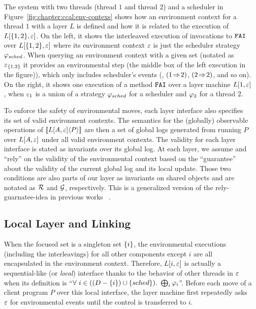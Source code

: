 The system with two threads
(thread $1$ and thread $2$) and a scheduler in Figure~\ref{fig:chapter:ccal:env-contexs}
shows how
an environment context for a thread $1$  with a layer $L$ is defined 
and how it is related to the execution of  $L[\{1,2\}, {\varepsilon}]$.
On the left, it shows the interleaved execution of
 invocations to ${\mathrm{\texttt{FAI}}}$ over $L[\{1, 2\}, {\varepsilon}]$
where its environment context ${\varepsilon}$ is just the scheduler
strategy $\varphi_{sched}$.
When querying an environment context with a given set (notated as ${\varepsilon}_{\{1, 2\}}$
it provides an environmental step (the middle box of the left execution in the figure)),
which only includes scheduler's events (\eg, $(1 \!\Rightarrow\! 2)$, $(2 \!\Rightarrow\! 2)$, and so on).
On the right, it shows one execution
of a method ${\mathrm{\texttt{FAI}}}$ over a layer machine $L[1, {\varepsilon}]$, when ${\varepsilon}_1$ is a union of
a strategy $\varphi_{sched}$ for a scheduler and $\varphi_{2}$ for
a thread $2$. 

To enforce the safety of environmental moves,
each layer interface also specifies its set of valid environment contexts.
The semantics for the (globally) observable operations of $[\![{L[A, {\varepsilon}]} \langle {P} \rangle]\!]$ are then a set of global logs
generated from running $P$ over $L[A, {\varepsilon}]$ under all valid
environment contexts. 
The validity for each layer interface is stated as invariants over its global log. 
At each layer, we assume and ``rely''  on the validity of the environmental context based on the ``guarantee'' about the validity of the current global log and its local update.
Those two conditions are also parts of our layer as invariants on shared objects and are notated as 
$\mathcal{R}$ and  $\mathcal{G}$, respectively.
This is a generalized version of the rely-guarnatee-idea in previous works ~\cite{feng07:sagl,vafeiadis:marriage,LRG,fu10:roch,sergey15}. 


\subsection{Local Layer and Linking}
\label{chapter:ccal:subsec:local-layer-with-environmental-context-and-local-layer-linking}
 
When the focused set is a singleton set $\{i\}$,
the environmental executions (including the interleavings) for all other components except $i$ are all encapsulated in the environment
context.
Therefore,  $L[i, {\varepsilon}]$ is actually a sequential-like (or \emph{local}) interface thanks to the behavior of other threads in ${\varepsilon}$ when
its definition is ``$\forall\ i \in ((D - \set{i}) \cup \set{sched}) .\ \bigoplus_{i} \strat{i}$''.
Before each move of a client program $P$ over this local interface, 
the layer machine first repeatedly asks ${\varepsilon}$ for environmental events until the control is transferred to $i$. 


